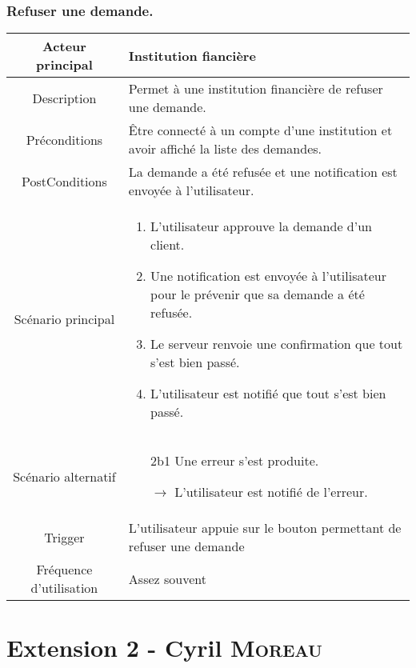 \documentclass{article}
\begin{document}
\subsubsection{Refuser une demande.}
\begin{table}[h]
   \begin{tabular}{|c|p{10cm}|}
      \hline
      Acteur principal&Institution fiancière\\
      \hline
      Description&Permet à une institution financière de refuser une demande.\\
      \hline
      Préconditions&Être connecté à un compte d'une institution et avoir affiché la liste des demandes.\\
      \hline
      PostConditions&La demande a été refusée et une notification est envoyée à l'utilisateur.\\
      \hline
      Scénario principal& 
            \begin{enumerate}
               \item L'utilisateur approuve la demande d'un client.
               \item Une notification est envoyée à l'utilisateur pour le prévenir que sa demande a été refusée.
               \item Le serveur renvoie une confirmation que tout s'est bien passé.
               \item L'utilisateur est notifié que tout s'est bien passé.
            \end{enumerate}     \\
      \hline
      Scénario alternatif&
            \begin{itemize}
               \item[2b1] Une erreur s'est produite.
               \item[$\rightarrow$] L'utilisateur est notifié de l'erreur.  
            \end{itemize}\\
      \hline
      Trigger&L'utilisateur appuie sur le bouton permettant de refuser une demande\\
      \hline
      Fréquence d'utilisation&Assez souvent\\
      \hline
   \end{tabular}
\end{table}

\newpage

\section{Extension 2 - Cyril \textsc{Moreau}}
\end{document}
